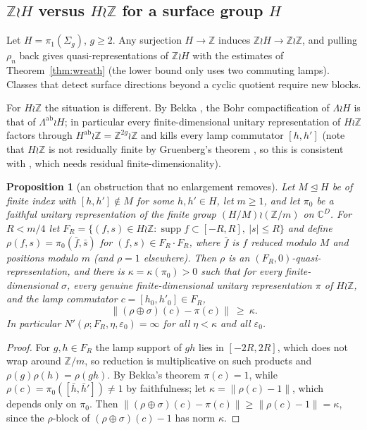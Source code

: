 \documentclass[11pt]{amsart}
\newtheorem{proposition}[theorem]{Proposition}
\theoremstyle{definition}
\theoremstyle{remark}
\newcommand{\Z}{\mathbb Z}
\newcommand{\C}{\mathbb C}
\newcommand{\norm}[1]{\lVert #1\rVert}
\begin{document}
\subsection{$\Z\wr H$ versus $H\wr\Z$ for a surface group $H$}

Let $H=\pi_1(\Sigma_g)$, $g\ge2$. Any surjection $H\to\Z$ induces $\Z\wr H\to\Z\wr\Z$, and pulling $\rho_n$ back gives quasi-representations of $\Z\wr H$ with the estimates of Theorem~\ref{thm:wreath} (the lower bound only uses two commuting lamps). Classes that detect surface directions beyond a cyclic quotient require new blocks.

For $H\wr\Z$ the situation is different. By Bekka \cite{Bek23}, the Bohr compactification of $\Lambda\wr H$ is that of $\Lambda^{\mathrm{ab}}\wr H$; in particular every finite-dimensional unitary representation of $H\wr\Z$ factors through $H^{\mathrm{ab}}\wr\Z=\Z^{2g}\wr\Z$ and kills every lamp commutator $[h,h']$ (note that $H\wr\Z$ is not residually finite by Gruenberg's theorem \cite{Gru57}, so this is consistent with \cite{FW26}, which needs residual finite-dimensionality).

\begin{proposition}[an obstruction that no enlargement removes]\label{prop:HwrZ}
Let $M\trianglelefteq H$ be of finite index with $[h,h']\notin M$ for some $h,h'\in H$, let $m\ge1$, and let $\pi_0$ be a faithful unitary representation of the finite group $(H/M)\wr(\Z/m)$ on $\C^D$. For $R<m/4$ let $F_R=\{(f,s)\in H\wr\Z:\operatorname{supp}f\subset[-R,R],\ |s|\le R\}$ and define $\rho(f,s)=\pi_0(\bar f,\bar s)$ for $(f,s)\in F_R\cdot F_R$, where $\bar f$ is $f$ reduced modulo $M$ and positions modulo $m$ (and $\rho=1$ elsewhere). Then $\rho$ is an $(F_R,0)$-quasi-representation, and there is $\kappa=\kappa(\pi_0)>0$ such that for every finite-dimensional $\sigma$, every genuine finite-dimensional unitary representation $\pi$ of $H\wr\Z$, and the lamp commutator $c=[h_0,h'_0]\in F_R$,
\[
\norm{(\rho\oplus\sigma)(c)-\pi(c)}\ \ge\ \kappa .
\]
In particular $N'(\rho;F_R,\eta,\varepsilon_0)=\infty$ for all $\eta<\kappa$ and all $\varepsilon_0$.
\end{proposition}
\begin{proof}
For $g,h\in F_R$ the lamp support of $gh$ lies in $[-2R,2R]$, which does not wrap around $\Z/m$, so reduction is multiplicative on such products and $\rho(g)\rho(h)=\rho(gh)$. By Bekka's theorem $\pi(c)=1$, while $\rho(c)=\pi_0([\bar h,\bar h'])\ne1$ by faithfulness; let $\kappa=\norm{\rho(c)-1}$, which depends only on $\pi_0$. Then $\norm{(\rho\oplus\sigma)(c)-\pi(c)}\ge\norm{\rho(c)-1}=\kappa$, since the $\rho$-block of $(\rho\oplus\sigma)(c)-1$ has norm $\kappa$.
\end{proof}
\end{document}
